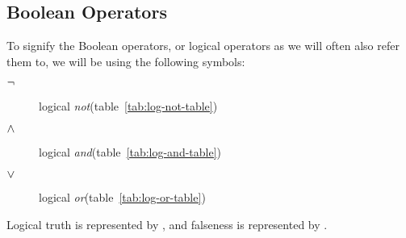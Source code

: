 \subsection{Boolean Operators}
\label{sec:boolean-operators}

To signify the Boolean operators, or logical operators as we will often
also refer them to, we will be using the following symbols:
\begin{samepage}
  \begin{description}
  \item[$\neg$] logical \textit{not}(table~\ref{tab:log-not-table})
  \item[$\wedge$] logical \textit{and}(table~\ref{tab:log-and-table})
  \item[$\vee$] logical \textit{or}(table~\ref{tab:log-or-table})
  \end{description}
\end{samepage}

Logical truth is represented by \True, and falseness is represented by
\False.

\begin{table}

    \caption{Logical truth tables}
\end{table}

